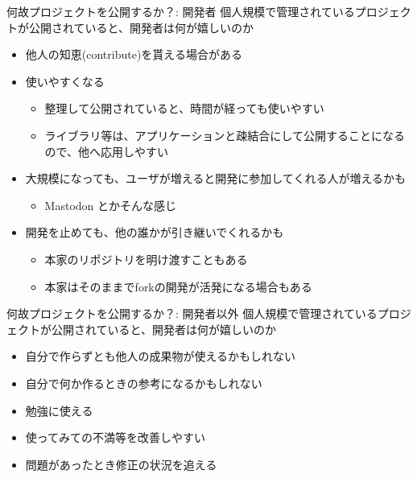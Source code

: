 \documentclass[
        unicode%
    ]{beamer}
\begin{document}
\begin{frame}{何故プロジェクトを公開するか？: 開発者}
    個人規模で管理されているプロジェクトが公開されていると、開発者は何が嬉しいのか

    \begin{itemize}
        \pause
        \item 他人の知恵(contribute)を貰える場合がある
        \pause
        \item 使いやすくなる
            \begin{itemize}
                \item 整理して公開されていると、時間が経っても使いやすい
                \item ライブラリ等は、アプリケーションと疎結合にして公開することになるので、他へ応用しやすい
            \end{itemize}
        \pause
        \item 大規模になっても、ユーザが増えると開発に参加してくれる人が増えるかも
            \begin{itemize}
                \item Mastodon とかそんな感じ
            \end{itemize}
        \pause
        \item 開発を止めても、他の誰かが引き継いでくれるかも
            \begin{itemize}
                \item 本家のリポジトリを明け渡すこともある
                \item 本家はそのままでforkの開発が活発になる場合もある
            \end{itemize}
    \end{itemize}
\end{frame}

\begin{frame}{何故プロジェクトを公開するか？: 開発者以外}
    個人規模で管理されているプロジェクトが公開されていると、開発者は何が嬉しいのか

    \begin{itemize}
        \pause
        \item 自分で作らずとも他人の成果物が使えるかもしれない
        \item 自分で何か作るときの参考になるかもしれない
        \pause
        \item 勉強に使える
        \pause
        \item 使ってみての不満等を改善しやすい
        \item 問題があったとき修正の状況を追える
    \end{itemize}
\end{frame}
\end{document}
